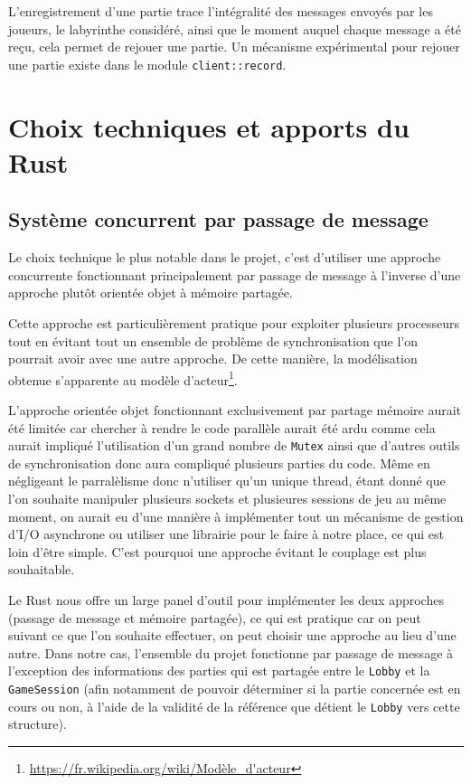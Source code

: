 \documentclass{EPUProjetDi}
\begin{document}
L'enregistrement d'une partie trace l'intégralité des messages envoyés par les joueurs, le labyrinthe considéré, ainsi que le moment auquel chaque message a été reçu, cela permet de rejouer une partie. Un mécanisme expérimental pour rejouer une partie existe dans le module \verb|client::record|.

\chapter{Choix techniques et apports du Rust}

\section{Système concurrent par passage de message}

Le choix technique le plus notable dans le projet, c'est d'utiliser une approche concurrente fonctionnant principalement par passage de message à l'inverse d'une approche plutôt orientée objet à mémoire partagée.

Cette approche est particulièrement pratique pour exploiter plusieurs processeurs tout en évitant tout un ensemble de problème de synchronisation que l'on pourrait avoir avec une autre approche. De cette manière, la modélisation obtenue s'apparente au modèle d'acteur\footnote{\url{https://fr.wikipedia.org/wiki/Modèle_d'acteur}}.

L'approche orientée objet fonctionnant exclusivement par partage mémoire aurait été limitée car chercher à rendre le code parallèle aurait été ardu comme cela aurait impliqué l'utilisation d'un grand nombre de \verb|Mutex| ainsi que d'autres outils de synchronisation donc aura compliqué plusieurs parties du code. Même en négligeant le parralèlisme donc n'utiliser qu'un unique thread, étant donné que l'on souhaite manipuler plusieurs sockets et plusieures sessions de jeu au même moment, on aurait eu d'une manière à implémenter tout un mécanisme de gestion d'I/O asynchrone ou utiliser une librairie pour le faire à notre place, ce qui est loin d'être simple. C'est pourquoi une approche évitant le couplage est plus souhaitable.

Le Rust nous offre un large panel d'outil pour implémenter les deux approches (passage de message et mémoire partagée), ce qui est pratique car on peut suivant ce que l'on souhaite effectuer, on peut choisir une approche au lieu d'une autre. Dans notre cas, l'ensemble du projet fonctionne par passage de message à l'exception des informations des parties qui est partagée entre le \verb|Lobby| et la \verb|GameSession| (afin notamment de pouvoir déterminer si la partie concernée est en cours ou non, à l'aide de la validité de la référence que détient le \verb|Lobby| vers cette structure).
\end{document}
